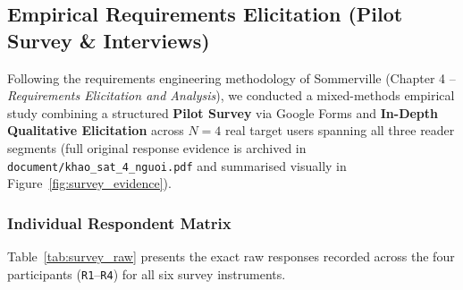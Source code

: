 \subsection{Empirical Requirements Elicitation (Pilot Survey \& Interviews)}
\label{subsec:elicitation}

Following the requirements engineering methodology of Sommerville (Chapter 4 -- \textit{Requirements Elicitation and Analysis}), we conducted a mixed-methods empirical study combining a structured \textbf{Pilot Survey} via Google Forms and \textbf{In-Depth Qualitative Elicitation} across $N = 4$ real target users spanning all three reader segments (full original response evidence is archived in \texttt{document/khao\_sat\_4\_nguoi.pdf} and summarised visually in Figure~\ref{fig:survey_evidence}).

\subsubsection{Individual Respondent Matrix}
Table~\ref{tab:survey_raw} presents the exact raw responses recorded across the four participants (\texttt{R1}--\texttt{R4}) for all six survey instruments.

